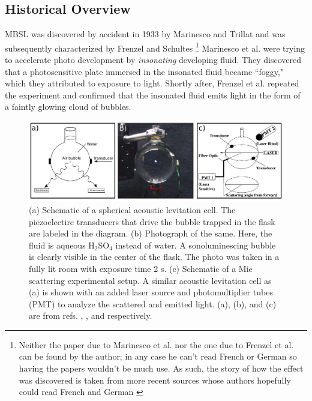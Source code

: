 \documentclass[rmp,aps,nofootinbib,superscriptaddress,floatfix]{revtex4-2}
\begin{document}
\subsection{Historical Overview}

MBSL was discovered by accident in 1933 by Marinesco and Trillat \cite{marinesco1933actions} and was subsequently characterized by Frenzel and Schultes \cite{frenzel1934luminescenz} \footnote{Neither the paper due to Marinesco et al. nor the one due to Frenzel et al. can be found by the author; in any case he can't read French or German so having the papers wouldn't be much use. As such, the story of how the effect was discovered is taken from more recent sources whose authors hopefully could read French and German \cite{brenner2002single,gaitan1990experimental,crum1994sonoluminescence}} Marinesco et al. were trying to accelerate photo development by \emph{insonating} developing fluid. They discovered that a photosensitive plate immersed in the insonated fluid became ``foggy," which they attributed to exposure to light. Shortly after, Frenzel et al. repeated the experiment and confirmed that the insonated fluid emits light in the form of a faintly glowing cloud of bubbles. 

\begin{figure}
\includegraphics[width=0.95\linewidth]{figs/flask.pdf}
    \caption{(a) Schematic of a spherical acoustic levitation cell. The piezoelectirc transducers that drive the bubble trapped in the flask are labeled in the diagram. (b) Photograph of the same. Here, the fluid is aqueous H$_2$SO$_4$ instead of water. A sonoluminescing bubble is clearly visible in the center of the flask. The photo was taken in a fully lit room with exposure time 2 s. (c) Schematic of a Mie scattering experimental setup. A similar acoustic levitation cell as (a) is shown with an added laser source and photomultiplier tubes (PMT) to analyze the scattered and emitted light. (a), (b), and (c) are from refs. \cite{brenner2002single}, \cite{suslick2008inside}, and \cite{gompf2000mie} respectively.}
\label{fig:flask}
\end{figure}
\end{document}
